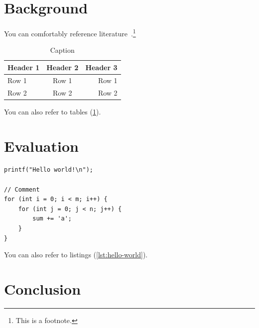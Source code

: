 \documentclass[
    12pt,
    a4paper,
    parskip=half,
]{scrartcl}
\begin{document}
\section{Background}
\label{sec:background}

You can comfortably reference literature~\cite{DBLP:journals/superfri/DuweLMSF0B020}.\footnote{This is a footnote.}

\begin{table}[ht]
    \centering
	\begin{tabular}{|l|c|r|}
		\hline
		\textbf{Header 1} & \textbf{Header 2} & \textbf{Header 3} \\
        \hline
		\hline
		Row 1 & Row 1 & Row 1 \\
		Row 2 & Row 2 & Row 2 \\
		\hline
	\end{tabular}
	\caption{Caption}
	\label{tab:table}
\end{table}

You can also refer to tables (\cref{tab:table}).

\section{Evaluation}
\label{sec:evaluation}

\begin{lstlisting}[caption=Caption,label=lst:hello-world]
printf("Hello world!\n");

// Comment
for (int i = 0; i < m; i++) {
    for (int j = 0; j < n; j++) {
        sum += 'a';
    }
}
\end{lstlisting}

You can also refer to listings (\cref{lst:hello-world}).

\section{Conclusion}
\label{sec:conclusion}


\lipsum[1-3]

\newpage



\end{document}
